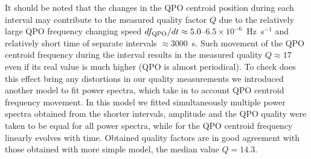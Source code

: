 \documentclass[a4paper,fleqn,usenatbib]{mnras}
\begin{document}
It should be noted that the changes in the QPO centroid position during each interval may contribute to the measured quality factor $Q$ due to the relatively large QPO frequency changing speed $d{f}_{\rm QPO}/dt \approx 5.0$--$6.5\times10^{-6}$~Hz~s$^{-1}$ and relatively short time of separate intervals $\approx3000$~s.
Such movement of the QPO centroid frequency during the interval results in the measured quality $Q \approx 17$ even if its real value is much higher (QPO is almost periodical).
To check does this effect bring any distortions in our quality measurements we introduced another model to fit power spectra, which take in to account QPO centroid frequency movement. 
In this model we fitted simultaneously multiple power spectra obtained from the shorter intervals, amplitude and the QPO quality were taken to be equal for all power spectra, while for the QPO centroid frequency  linearly evolves with time.
Obtained quality factors are in good agreement with those obtained with more simple model, the median value $Q=14.3$.

\end{document}
